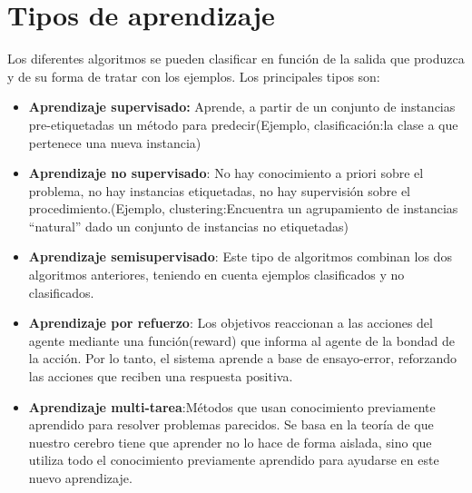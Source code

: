 \documentclass[a4paper, 11pt]{article} %
\begin{document}
\section{Tipos de aprendizaje}
Los diferentes algoritmos se pueden clasificar en función de la salida que produzca y de su forma de tratar con los ejemplos. Los principales tipos son:
\begin{itemize}
	\item \textbf{Aprendizaje supervisado:} Aprende, a partir de un conjunto de instancias pre-etiquetadas un método para predecir(Ejemplo, clasificación:la clase a que pertenece una nueva instancia)
	\item \textbf{Aprendizaje no supervisado}: No hay conocimiento a priori sobre el problema, no hay instancias etiquetadas, no hay supervisión sobre el procedimiento.(Ejemplo, clustering:Encuentra un agrupamiento de instancias “natural” dado un conjunto de instancias no etiquetadas)
	\item \textbf{Aprendizaje semisupervisado}: Este tipo de algoritmos combinan los dos algoritmos anteriores, teniendo en cuenta ejemplos clasificados y no clasificados.
	\item \textbf{Aprendizaje por refuerzo}: Los objetivos reaccionan a las acciones del agente mediante una función(reward) que informa al agente de la bondad de la acción. Por lo tanto, el sistema aprende a base de ensayo-error, reforzando las acciones que reciben una respuesta positiva.
	\item \textbf{Aprendizaje multi-tarea}:Métodos que usan conocimiento previamente aprendido para resolver problemas parecidos. Se basa en la teoría de que nuestro cerebro tiene que aprender no lo hace de forma aislada, sino que utiliza todo el conocimiento previamente aprendido para ayudarse en este nuevo aprendizaje.
\end{itemize}
\end{document}
